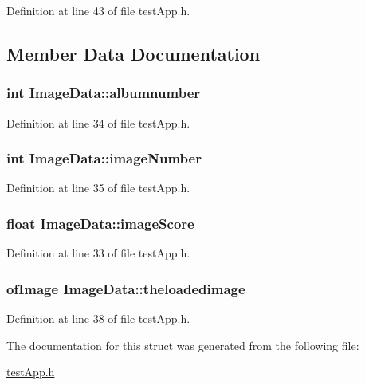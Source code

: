 Definition at line 43 of file test\-App.\-h.



\subsection{Member Data Documentation}
\hypertarget{struct_image_data_a372655668350953b85fda1f07cd3ffe1}{
\subsubsection[{albumnumber}]{\setlength{\rightskip}{0pt plus 5cm}int Image\-Data\-::albumnumber}}\label{struct_image_data_a372655668350953b85fda1f07cd3ffe1}


Definition at line 34 of file test\-App.\-h.

\hypertarget{struct_image_data_a254eb9353be246c69591d51088683397}{
\subsubsection[{image\-Number}]{\setlength{\rightskip}{0pt plus 5cm}int Image\-Data\-::image\-Number}}\label{struct_image_data_a254eb9353be246c69591d51088683397}


Definition at line 35 of file test\-App.\-h.

\hypertarget{struct_image_data_a7161728d2f1bd4240bd9359f6276dd3b}{
\subsubsection[{image\-Score}]{\setlength{\rightskip}{0pt plus 5cm}float Image\-Data\-::image\-Score}}\label{struct_image_data_a7161728d2f1bd4240bd9359f6276dd3b}


Definition at line 33 of file test\-App.\-h.

\hypertarget{struct_image_data_acf1bde00dd79a0960269618d9b885f61}{
\subsubsection[{theloadedimage}]{\setlength{\rightskip}{0pt plus 5cm}of\-Image Image\-Data\-::theloadedimage}}\label{struct_image_data_acf1bde00dd79a0960269618d9b885f61}


Definition at line 38 of file test\-App.\-h.



The documentation for this struct was generated from the following file\-:\begin{DoxyCompactItemize}
\item 
\hyperlink{test_app_8h}{test\-App.\-h}\end{DoxyCompactItemize}
